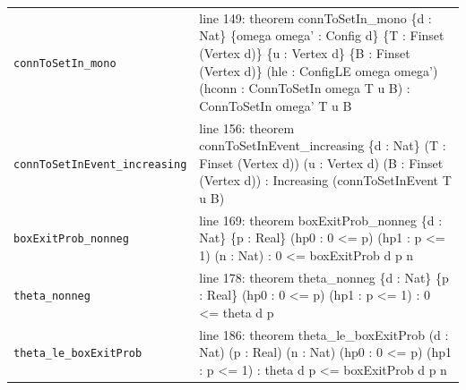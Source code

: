 \documentclass[10pt]{article}
\begin{document}
\begin{longtable}{>{\raggedright\arraybackslash}p{} >{\raggedright\arraybackslash}p{}}
\texttt{connToSetIn\_\allowbreak{}mono} & {\ttfamily\scriptsize line 149:\allowbreak{} theorem connToSetIn\_\allowbreak{}mono \{d :\allowbreak{} Nat\} \{omega omega' :\allowbreak{} Config d\} \{T :\allowbreak{} Finset (\allowbreak{}Vertex d)\allowbreak{}\} \{u :\allowbreak{} Vertex d\} \{B :\allowbreak{} Finset (\allowbreak{}Vertex d)\allowbreak{}\} (\allowbreak{}hle :\allowbreak{} ConfigLE omega omega')\allowbreak{} (\allowbreak{}hconn :\allowbreak{} ConnToSetIn omega T u B)\allowbreak{} :\allowbreak{} ConnToSetIn omega' T u B} \\[0.45em]
\texttt{connToSetInEvent\_\allowbreak{}increasing} & {\ttfamily\scriptsize line 156:\allowbreak{} theorem connToSetInEvent\_\allowbreak{}increasing \{d :\allowbreak{} Nat\} (\allowbreak{}T :\allowbreak{} Finset (\allowbreak{}Vertex d)\allowbreak{})\allowbreak{} (\allowbreak{}u :\allowbreak{} Vertex d)\allowbreak{} (\allowbreak{}B :\allowbreak{} Finset (\allowbreak{}Vertex d)\allowbreak{})\allowbreak{} :\allowbreak{} Increasing (\allowbreak{}connToSetInEvent T u B)\allowbreak{}} \\[0.45em]
\texttt{boxExitProb\_\allowbreak{}nonneg} & {\ttfamily\scriptsize line 169:\allowbreak{} theorem boxExitProb\_\allowbreak{}nonneg \{d :\allowbreak{} Nat\} \{p :\allowbreak{} Real\} (\allowbreak{}hp0 :\allowbreak{} 0 <=\allowbreak{} p)\allowbreak{} (\allowbreak{}hp1 :\allowbreak{} p <=\allowbreak{} 1)\allowbreak{} (\allowbreak{}n :\allowbreak{} Nat)\allowbreak{} :\allowbreak{} 0 <=\allowbreak{} boxExitProb d p n} \\[0.45em]
\texttt{theta\_\allowbreak{}nonneg} & {\ttfamily\scriptsize line 178:\allowbreak{} theorem theta\_\allowbreak{}nonneg \{d :\allowbreak{} Nat\} \{p :\allowbreak{} Real\} (\allowbreak{}hp0 :\allowbreak{} 0 <=\allowbreak{} p)\allowbreak{} (\allowbreak{}hp1 :\allowbreak{} p <=\allowbreak{} 1)\allowbreak{} :\allowbreak{} 0 <=\allowbreak{} theta d p} \\[0.45em]
\texttt{theta\_\allowbreak{}le\_\allowbreak{}boxExitProb} & {\ttfamily\scriptsize line 186:\allowbreak{} theorem theta\_\allowbreak{}le\_\allowbreak{}boxExitProb (\allowbreak{}d :\allowbreak{} Nat)\allowbreak{} (\allowbreak{}p :\allowbreak{} Real)\allowbreak{} (\allowbreak{}n :\allowbreak{} Nat)\allowbreak{} (\allowbreak{}hp0 :\allowbreak{} 0 <=\allowbreak{} p)\allowbreak{} (\allowbreak{}hp1 :\allowbreak{} p <=\allowbreak{} 1)\allowbreak{} :\allowbreak{} theta d p <=\allowbreak{} boxExitProb d p n} \\[0.45em]

\end{longtable}
\end{document}
